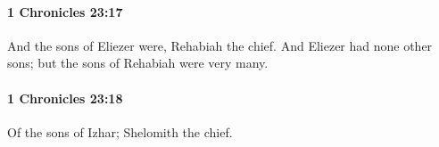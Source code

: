		\paragraph{1 Chronicles 23:17} %
			\label{1CHRONICLES-23-17}

			And the sons of Eliezer were, Rehabiah the chief. And Eliezer had none other sons; but the sons of Rehabiah were very many.


		\paragraph{1 Chronicles 23:18} %
			\label{1CHRONICLES-23-18}

			Of the sons of Izhar; Shelomith the chief.



